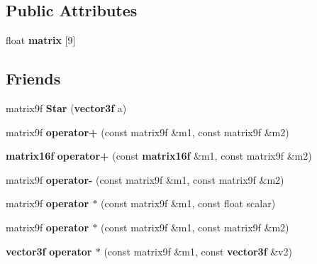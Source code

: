 \subsection*{Public Attributes}
\begin{CompactItemize}
\item 
{}
float {\bf matrix} [9]\label{classmatrix9f_m0}

\end{CompactItemize}
\subsection*{Friends}
\begin{CompactItemize}
\item 
{}
matrix9f {\bf Star} ({\bf vector3f} a)\label{classmatrix9f_l0}

\item 
{}
matrix9f {\bf operator+} (const matrix9f \&m1, const matrix9f \&m2)\label{classmatrix9f_l1}

\item 
{}
{\bf matrix16f} {\bf operator+} (const {\bf matrix16f} \&m1, const matrix9f \&m2)\label{classmatrix9f_l2}

\item 
{}
matrix9f {\bf operator-} (const matrix9f \&m1, const matrix9f \&m2)\label{classmatrix9f_l3}

\item 
{}
matrix9f {\bf operator $\ast$} (const matrix9f \&m1, const float scalar)\label{classmatrix9f_l4}

\item 
{}
matrix9f {\bf operator $\ast$} (const matrix9f \&m1, const matrix9f \&m2)\label{classmatrix9f_l5}

\item 
{}
{\bf vector3f} {\bf operator $\ast$} (const matrix9f \&m1, const {\bf vector3f} \&v2)\label{classmatrix9f_l6}


\end{CompactItemize}

